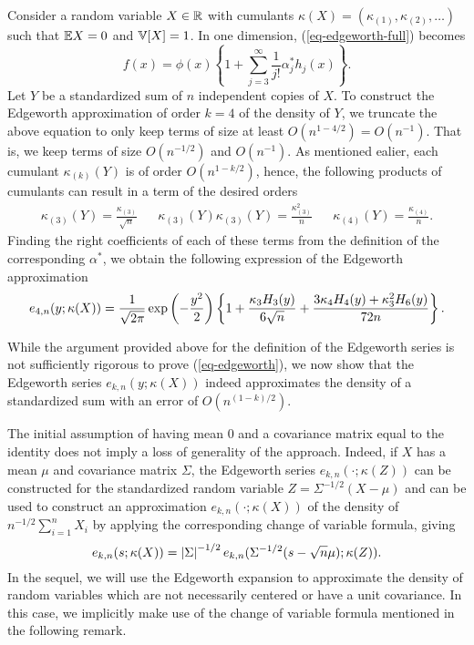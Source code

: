 \begin{example} \label{ex-edgeworth-1d}
    Consider a random variable $X \in \mathbb{R}$ with cumulants $\kappa(X) = (\kappa_{(1)}, \kappa_{(2)}, \ldots)$ such that $\mathbb{E}{X} = 0$ and $\mathbb{V}[X] = 1$. In one dimension, (\ref{eq-edgeworth-full}) becomes
    \begin{equation*}
        f(x) = \phi(x) \left\{
            1 + \sum_{j=3}^\infty  \frac{1}{j!}\alpha^*_j h_j(x)
        \right\}.
    \end{equation*}
    Let $Y$ be a standardized sum of $n$ independent copies of $X$. To construct the Edgeworth approximation of order $k = 4$ of the density of $Y$, we truncate the above equation to only keep terms of size at least $O(n^{1-4/2}) = O(n^{-1})$. That is, we keep terms of size $O(n^{-1/2})$ and $O(n^{-1})$. As mentioned ealier, each cumulant $\kappa_{(k)}(Y)$ is of order $O(n^{1-k/2})$, hence, the following products of cumulants can result in a term of the desired orders
    \begin{align*}
        \kappa_{(3)}(Y) = \frac{\kappa_{(3)}}{\sqrt{n}} && \kappa_{(3)}(Y)\kappa_{(3)}(Y) = \frac{\kappa_{(3)}^2}{n} && \kappa_{(4)}(Y) = \frac{\kappa_{(4)}}{n}.
    \end{align*}
    Finding the right coefficients of each of these terms from the definition of the corresponding $\alpha^*$, we obtain the following expression of the Edgeworth approximation
    \begin{equation} \label{eq-edgeworth-1d-4}
        e_{4, n}(y; \kappa(X)) = \frac{1}{\sqrt{2\pi}}\exp\left(-\frac{y^2}{2}\right)\left\{1 + \frac{\kappa_3 H_3(y)}{6\sqrt{n}} + \frac{3\kappa_4 H_4(y) + \kappa_3^2 H_6(y)}{72 n}\right\}.
    \end{equation}
\end{example}

While the argument provided above for the definition of the Edgeworth series is not sufficiently rigorous to prove (\ref{eq-edgeworth}), we now show that the Edgeworth series $e_{k, n}(y; \kappa(X))$ indeed approximates the density of a standardized sum with an error of $O(n^{(1-k)/2})$.

\begin{remark} \label{rem-centering}
    The initial assumption of having mean 0 and a covariance matrix equal to the identity does not imply a loss of generality of the approach. Indeed, if $X$ has a mean $\mu$ and covariance matrix $\Sigma$, the Edgeworth series $e_{k, n}(\cdot; \kappa(Z))$ can be constructed for the standardized random variable $Z = \Sigma^{-1/2}(X - \mu)$ and can be used to construct an approximation $e_{k, n}(\cdot; \kappa(X))$ of the density of $n^{-1/2} \sum_{i=1}^n X_i$ by applying the corresponding change of variable formula, giving
    \begin{equation*}
        e_{k, n}(s; \kappa(X)) = \left|\Sigma\right|^{-1/2} e_{k, n}(\Sigma^{-1/2}(s - \sqrt{n}\mu); \kappa(Z)).
    \end{equation*}
    In the sequel, we will use the Edgeworth expansion to approximate the density of random variables which are not necessarily centered or have a unit covariance. In this case, we implicitly make use of the change of variable formula mentioned in the following remark. 
\end{remark}


